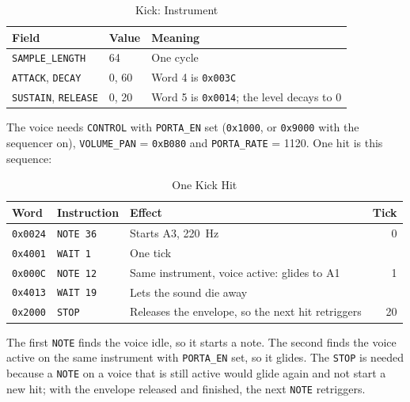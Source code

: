 \begin{table}[H]
	\centering
	\begin{tabular}{llp{6cm}}
		\toprule
		\textbf{Field}                     & \textbf{Value} & \textbf{Meaning}                                 \\
		\midrule
		\texttt{SAMPLE\_LENGTH}            & 64             & One cycle                                        \\
		\texttt{ATTACK}, \texttt{DECAY}    & 0, 60          & Word 4 is \texttt{0x003C}                        \\
		\texttt{SUSTAIN}, \texttt{RELEASE} & 0, 20          & Word 5 is \texttt{0x0014}; the level decays to 0 \\
		\bottomrule
	\end{tabular}
	\caption{Kick: Instrument}
	\label{tab:ex-kick}
\end{table}

The voice needs \texttt{CONTROL} with \texttt{PORTA\_EN} set (\texttt{0x1000}, or \texttt{0x9000} with the sequencer
on), \texttt{VOLUME\_PAN} = \texttt{0xB080} and \texttt{PORTA\_RATE} = 1120. One hit is this sequence:

\begin{table}[H]
	\centering
	\small
	\begin{tabular}{llp{6.4cm}r}
		\toprule
		\textbf{Word}   & \textbf{Instruction} & \textbf{Effect}                                   & \textbf{Tick} \\
		\midrule
		\texttt{0x0024} & \texttt{NOTE 36}     & Starts A3, 220~Hz                                 & 0             \\
		\texttt{0x4001} & \texttt{WAIT 1}      & One tick                                          &               \\
		\texttt{0x000C} & \texttt{NOTE 12}     & Same instrument, voice active: glides to A1       & 1             \\
		\texttt{0x4013} & \texttt{WAIT 19}     & Lets the sound die away                           &               \\
		\texttt{0x2000} & \texttt{STOP}        & Releases the envelope, so the next hit retriggers & 20            \\
		\bottomrule
	\end{tabular}
	\caption{One Kick Hit}
	\label{tab:ex-kick-seq}
\end{table}

The first \texttt{NOTE} finds the voice idle, so it starts a note. The second finds the voice active on the same
instrument with \texttt{PORTA\_EN} set, so it glides. The \texttt{STOP} is needed because a \texttt{NOTE} on a voice
that is still active would glide again and not start a new hit; with the envelope released and finished, the next
\texttt{NOTE} retriggers.

